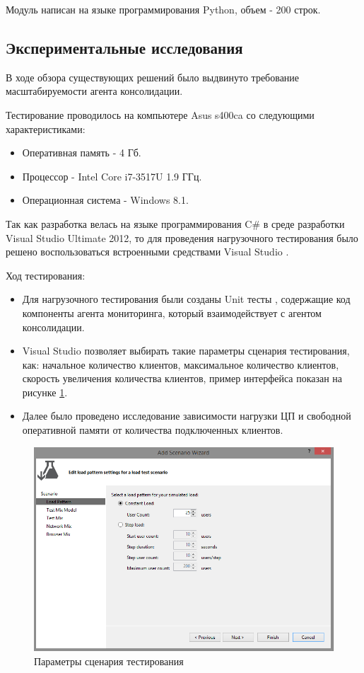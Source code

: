 \documentclass[russian, utf8, emptystyle]{eskdtext}
\begin{document}
Модуль написан на языке программирования Python, объем - 200 строк.
\subsection{Экспериментальные исследования}
В ходе обзора существующих решений было выдвинуто требование масштабируемости агента консолидации.

Тестирование проводилось на компьютере Asus s400ca со следующими характеристиками:
\begin{itemize}
	\item Оперативная память - 4 Гб.
	\item Процессор - Intel Core i7-3517U 1.9 ГГц.
	\item Операционная система - Windows 8.1.
\end{itemize}	

Так как разработка велась на языке программирования C\# в среде разработки Visual Studio Ultimate 2012, то для проведения нагрузочного тестирования было решено воспользоваться встроенными средствами Visual Studio \cite{test}.

Ход тестирования:
\begin{itemize}
	\item Для нагрузочного тестирования были созданы Unit тесты \cite{unitTest}, содержащие код компоненты агента мониторинга, который взаимодействует с агентом консолидации.
	\item Visual Studio позволяет выбирать такие параметры сценария тестирования, как: начальное количество клиентов, максимальное количество клиентов, скорость увеличения
	количества клиентов, пример интерфейса показан на рисунке \ref{fig:scenario}.
	\item Далее было проведено исследование зависимости нагрузки ЦП и свободной оперативной памяти от количества подключенных клиентов.
\end{itemize}
	 \begin{figure}[h]
	 	\begin{center}
	 		\includegraphics[width=14cm]{pic/test.png}
	 		\caption{Параметры сценария тестирования}
	 		\label{fig:scenario}
	 	\end{center}
	 \end{figure}
\end{document}
